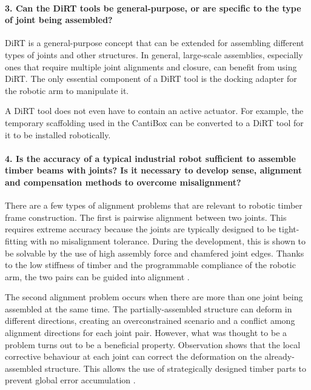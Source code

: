 \paragraph{3. Can the DiRT tools be general-purpose, or are specific to the type of joint being assembled?}

DiRT is a general-purpose concept that can be extended for assembling different types of joints and other structures. In general, large-scale assemblies, especially ones that require multiple joint alignments and closure, can benefit from using DiRT. The only essential component of a DiRT tool is the docking adapter for the robotic arm to manipulate it. 

A DiRT tool does not even have to contain an active actuator. For example, the temporary scaffolding  used in the CantiBox can be converted to a DiRT tool  for it to be installed robotically.

\paragraph{4. Is the accuracy of a typical industrial robot sufficient to assemble timber beams with joints? Is it necessary to develop sense, alignment and compensation methods to overcome misalignment?}

There are a few types of alignment problems that are relevant to robotic timber frame construction. The first is pairwise alignment between two joints. This requires extreme accuracy because the joints are typically designed to be tight-fitting with no misalignment tolerance. During the development, this is shown to be solvable by the use of high assembly force and chamfered joint edges. Thanks to the low stiffness of timber and the programmable compliance of the robotic arm, the two pairs can be guided into alignment .

The second alignment problem occurs when there are more than one joint being assembled at the same time. The partially-assembled structure can deform in different directions, creating an overconstrained scenario and a conflict among alignment directions for each joint pair. However, what was thought to be a problem turns out to be a beneficial property. Observation shows that the local corrective behaviour at each joint can correct the deformation on the already-assembled structure. This allows the use of strategically designed timber parts to prevent global error accumulation .

